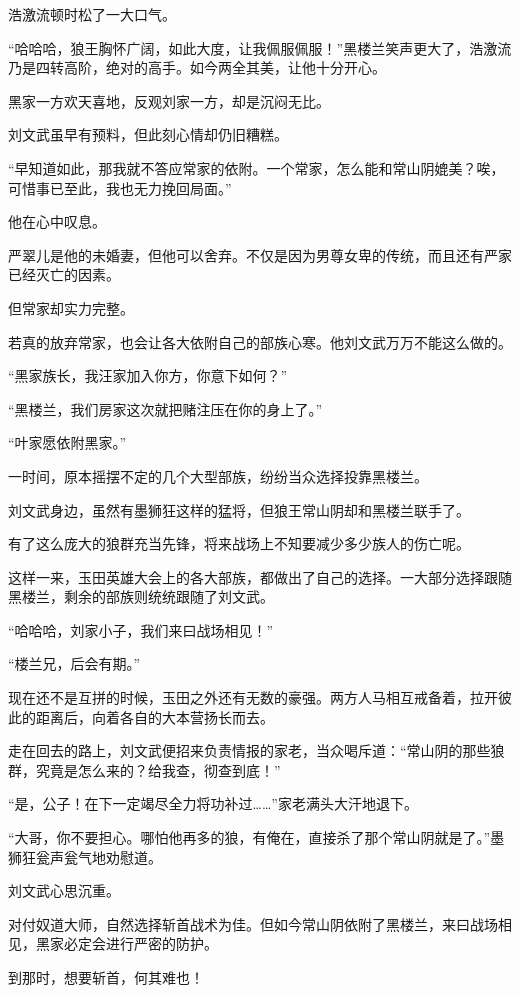\begin{this_body}
浩激流顿时松了一大口气。

“哈哈哈，狼王胸怀广阔，如此大度，让我佩服佩服！”黑楼兰笑声更大了，浩激流乃是四转高阶，绝对的高手。如今两全其美，让他十分开心。

黑家一方欢天喜地，反观刘家一方，却是沉闷无比。

刘文武虽早有预料，但此刻心情却仍旧糟糕。

“早知道如此，那我就不答应常家的依附。一个常家，怎么能和常山阴媲美？唉，可惜事已至此，我也无力挽回局面。”

他在心中叹息。

严翠儿是他的未婚妻，但他可以舍弃。不仅是因为男尊女卑的传统，而且还有严家已经灭亡的因素。

但常家却实力完整。

若真的放弃常家，也会让各大依附自己的部族心寒。他刘文武万万不能这么做的。

“黑家族长，我汪家加入你方，你意下如何？”

“黑楼兰，我们房家这次就把赌注压在你的身上了。”

“叶家愿依附黑家。”

一时间，原本摇摆不定的几个大型部族，纷纷当众选择投靠黑楼兰。

刘文武身边，虽然有墨狮狂这样的猛将，但狼王常山阴却和黑楼兰联手了。

有了这么庞大的狼群充当先锋，将来战场上不知要减少多少族人的伤亡呢。

这样一来，玉田英雄大会上的各大部族，都做出了自己的选择。一大部分选择跟随黑楼兰，剩余的部族则统统跟随了刘文武。

“哈哈哈，刘家小子，我们来曰战场相见！”

“楼兰兄，后会有期。”

现在还不是互拼的时候，玉田之外还有无数的豪强。两方人马相互戒备着，拉开彼此的距离后，向着各自的大本营扬长而去。

走在回去的路上，刘文武便招来负责情报的家老，当众喝斥道：“常山阴的那些狼群，究竟是怎么来的？给我查，彻查到底！”

“是，公子！在下一定竭尽全力将功补过……”家老满头大汗地退下。

“大哥，你不要担心。哪怕他再多的狼，有俺在，直接杀了那个常山阴就是了。”墨狮狂瓮声瓮气地劝慰道。

刘文武心思沉重。

对付奴道大师，自然选择斩首战术为佳。但如今常山阴依附了黑楼兰，来曰战场相见，黑家必定会进行严密的防护。

到那时，想要斩首，何其难也！


\end{this_body}
